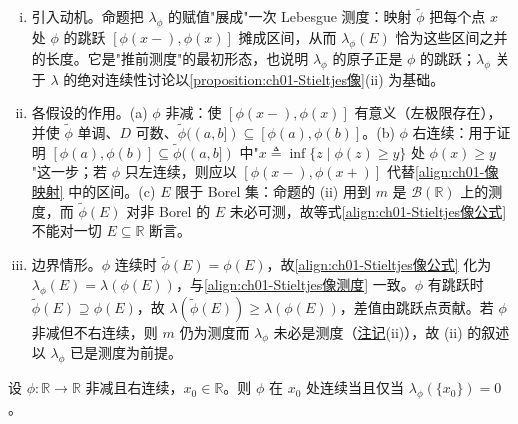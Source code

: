 \documentclass[../../main.tex]{subfiles}%
\begin{document}
\begin{remark}\label{remark:ch01-Stieltjes像刻画}
\begin{enumerate}[(i)]
\item 引入动机。命题把 $\lambda_\phi$ 的赋值"展成"一次 Lebesgue 测度：映射 $\widetilde{\phi}$ 把每个点 $x$ 处 $\phi$ 的跳跃 $[\phi(x-),\phi(x)]$ 摊成区间，从而 $\lambda_\phi(E)$ 恰为这些区间之并的长度。它是"推前测度"的最初形态，也说明 $\lambda_\phi$ 的原子正是 $\phi$ 的跳跃；$\lambda_\phi$ 关于 $\lambda$ 的绝对连续性讨论以\cref{proposition:ch01-Stieltjes像}(ii) 为基础。
\item 各假设的作用。(a) $\phi$ 非减：使 $[\phi(x-),\phi(x)]$ 有意义（左极限存在），并使 $\widetilde{\phi}$ 单调、$D$ 可数、$\widetilde{\phi}((a,b])\subseteq[\phi(a),\phi(b)]$。(b) $\phi$ 右连续：用于证明 $[\phi(a),\phi(b)]\subseteq\widetilde{\phi}((a,b])$ 中"$x\triangleq\inf\{z\mid\phi(z)\geqslant y\}$ 处 $\phi(x)\geqslant y$"这一步；若 $\phi$ 只左连续，则应以 $[\phi(x-),\phi(x+)]$ 代替\eqref{align:ch01-像映射} 中的区间。(c) $E$ 限于 Borel 集：命题的 (ii) 用到 $m$ 是 $\mathcal{B}(\mathbb{R})$ 上的测度，而 $\widetilde{\phi}(E)$ 对非 Borel 的 $E$ 未必可测，故等式\eqref{align:ch01-Stieltjes像公式} 不能对一切 $E\subseteq\mathbb{R}$ 断言。
\item 边界情形。$\phi$ 连续时 $\widetilde{\phi}(E)=\phi(E)$，故\eqref{align:ch01-Stieltjes像公式} 化为 $\lambda_\phi(E)=\lambda(\phi(E))$，与\eqref{align:ch01-Stieltjes像测度} 一致。$\phi$ 有跳跃时 $\widetilde{\phi}(E)\supseteq\phi(E)$，故 $\lambda(\widetilde{\phi}(E))\geqslant\lambda(\phi(E))$，差值由跳跃点贡献。若 $\phi$ 非减但不右连续，则 $m$ 仍为测度而 $\lambda_\phi$ 未必是测度（\hyperref[remark:ch01-Stieltjes测度构造]{注记}(ii)），故 (ii) 的叙述以 $\lambda_\phi$ 已是测度为前提。
\end{enumerate}
\end{remark}

\begin{corollary}\label{corollary:ch01-Stieltjes连续}
设 $\phi:\mathbb{R}\to\mathbb{R}$ 非减且右连续，$x_0\in\mathbb{R}$。则 $\phi$ 在 $x_0$ 处连续当且仅当 $\lambda_\phi(\{x_0\})=0$。
\end{corollary}
\end{document}
